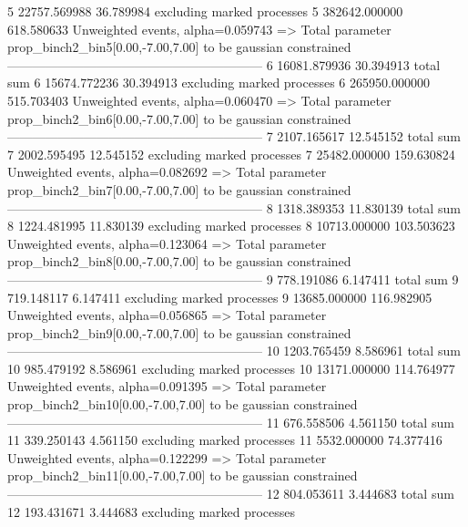 5          22757.569988    36.789984       excluding marked processes    
5          382642.000000   618.580633      Unweighted events, alpha=0.059743
  => Total parameter prop_binch2_bin5[0.00,-7.00,7.00] to be gaussian constrained
------------------------------------------------------------
6          16081.879936    30.394913       total sum                     
6          15674.772236    30.394913       excluding marked processes    
6          265950.000000   515.703403      Unweighted events, alpha=0.060470
  => Total parameter prop_binch2_bin6[0.00,-7.00,7.00] to be gaussian constrained
------------------------------------------------------------
7          2107.165617     12.545152       total sum                     
7          2002.595495     12.545152       excluding marked processes    
7          25482.000000    159.630824      Unweighted events, alpha=0.082692
  => Total parameter prop_binch2_bin7[0.00,-7.00,7.00] to be gaussian constrained
------------------------------------------------------------
8          1318.389353     11.830139       total sum                     
8          1224.481995     11.830139       excluding marked processes    
8          10713.000000    103.503623      Unweighted events, alpha=0.123064
  => Total parameter prop_binch2_bin8[0.00,-7.00,7.00] to be gaussian constrained
------------------------------------------------------------
9          778.191086      6.147411        total sum                     
9          719.148117      6.147411        excluding marked processes    
9          13685.000000    116.982905      Unweighted events, alpha=0.056865
  => Total parameter prop_binch2_bin9[0.00,-7.00,7.00] to be gaussian constrained
------------------------------------------------------------
10         1203.765459     8.586961        total sum                     
10         985.479192      8.586961        excluding marked processes    
10         13171.000000    114.764977      Unweighted events, alpha=0.091395
  => Total parameter prop_binch2_bin10[0.00,-7.00,7.00] to be gaussian constrained
------------------------------------------------------------
11         676.558506      4.561150        total sum                     
11         339.250143      4.561150        excluding marked processes    
11         5532.000000     74.377416       Unweighted events, alpha=0.122299
  => Total parameter prop_binch2_bin11[0.00,-7.00,7.00] to be gaussian constrained
------------------------------------------------------------
12         804.053611      3.444683        total sum                     
12         193.431671      3.444683        excluding marked processes    
